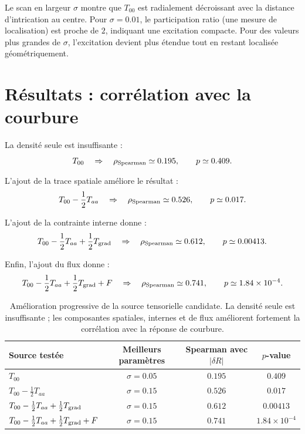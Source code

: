 \documentclass[11pt,a4paper]{article}
\begin{document}
Le scan en largeur \(\sigma\) montre que \(T_{00}\) est radialement décroissant
avec la distance d'intrication au centre. Pour \(\sigma = 0.01\), le
participation ratio (une mesure de localisation) est proche de \(2\),
indiquant une excitation compacte. Pour des valeurs plus grandes de \(\sigma\),
l'excitation devient plus étendue tout en restant localisée géométriquement.

\section{Résultats : corrélation avec la courbure}

La densité seule est insuffisante :
\[
T_{00}
\quad\Rightarrow\quad
\rho_{\rm Spearman} \simeq 0.195,
\qquad
p \simeq 0.409.
\]

L'ajout de la trace spatiale améliore le résultat :
\[
T_{00} - \frac12 T_{aa}
\quad\Rightarrow\quad
\rho_{\rm Spearman} \simeq 0.526,
\qquad
p \simeq 0.017.
\]

L'ajout de la contrainte interne donne :
\[
T_{00} - \frac12 T_{aa} + \frac12 T_{\rm grad}
\quad\Rightarrow\quad
\rho_{\rm Spearman} \simeq 0.612,
\qquad
p \simeq 0.00413.
\]

Enfin, l'ajout du flux donne :
\[
T_{00} - \frac12 T_{aa} + \frac12 T_{\rm grad} + F
\quad\Rightarrow\quad
\rho_{\rm Spearman} \simeq 0.741,
\qquad
p \simeq 1.84 \times 10^{-4}.
\]

\begin{table}[htbp]
\centering
\begin{tabular}{l c c c}
\toprule
Source testée & Meilleurs paramètres & Spearman avec \(|\delta R|\) & \(p\)-value \\
\midrule
\(T_{00}\) & \(\sigma = 0.05\) & \(0.195\) & \(0.409\) \\
\(T_{00} - \frac12 T_{aa}\) & \(\sigma = 0.15\) & \(0.526\) & \(0.017\) \\
\(T_{00} - \frac12 T_{aa} + \frac12 T_{\rm grad}\) & \(\sigma = 0.15\) & \(0.612\) & \(0.00413\) \\
\(T_{00} - \frac12 T_{aa} + \frac12 T_{\rm grad} + F\) & \(\sigma = 0.15\) & \(0.741\) & \(1.84 \times 10^{-4}\) \\
\bottomrule
\end{tabular}
\caption{
Amélioration progressive de la source tensorielle candidate. La densité seule
est insuffisante ; les composantes spatiales, internes et de flux améliorent
fortement la corrélation avec la réponse de courbure.
}
\end{table}
\end{document}
